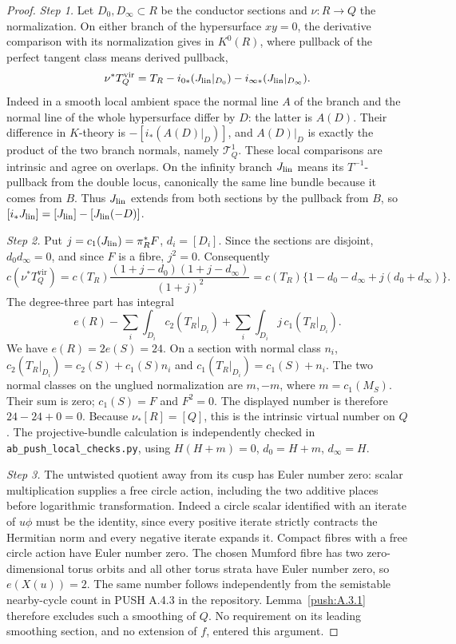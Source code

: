 \documentclass[11pt,a4paper]{article}
\theoremstyle{plain}
\theoremstyle{definition}
\begin{document}
\begin{proof}
\par\noindent\textit{Step 1.} Let $D_0,D_\infty\subset R$ be the conductor sections and
$\nu:R\to Q$ the normalization. On either branch of the
hypersurface $xy=0$, the derivative comparison with its
normalization gives in $K^0(R)$, where pullback of the
perfect tangent class means derived pullback,
\[
 \nu^*T_Q^{\mathrm{vir}}
 =T_R-i_{0*}(J_{\rm lin}|_{D_0})-i_{\infty*}(J_{\rm lin}|_{D_\infty}).
\]
Indeed in a smooth local ambient space the normal line $A$ of
the branch and the normal line of the whole hypersurface
differ by $D$: the latter is $A(D)$. Their difference in
$K$-theory is $-[i_*(A(D)|_D)]$, and $A(D)|_D$ is exactly
the product of the two branch normals, namely $\mathcal T^1_Q$.
These local comparisons are intrinsic and agree on overlaps.
On the infinity branch $J_{\rm lin}$ means its $T^{-1}$-pullback
from the double locus, canonically the same line bundle
because it comes from $B$. Thus $J_{\rm lin}$ extends from both sections by the pullback from $B$,
so $[i_*J_{\rm lin}]=[J_{\rm lin}]-[J_{\rm lin}(-D)]$.

\par\noindent\textit{Step 2.} Put $j=c_1(J_{\rm lin})=\pi_R^*F$, $d_i=[D_i]$. Since the sections are
disjoint, $d_0d_\infty=0$, and since $F$ is a fibre, $j^2=0$.
Consequently
\[
 c(\nu^*T_Q^{\mathrm{vir}})
 =c(T_R)\frac{(1+j-d_0)(1+j-d_\infty)}{(1+j)^2}
 =c(T_R)\{1-d_0-d_\infty+j(d_0+d_\infty)\}.
\]
The degree-three part has integral
\[
 e(R)-\sum_i\int_{D_i}c_2(T_R|_{D_i})
       +\sum_i\int_{D_i}j\,c_1(T_R|_{D_i}).
\]
We have $e(R)=2e(S)=24$. On a section with normal class
$n_i$, $c_2(T_R|_{D_i})=c_2(S)+c_1(S)n_i$ and
$c_1(T_R|_{D_i})=c_1(S)+n_i$. The two normal classes on
the unglued normalization are $m,-m$, where $m=c_1(M_S)$.
Their sum is zero; $c_1(S)=F$ and $F^2=0$. The displayed
number is therefore $24-24+0=0$. Because
$\nu_*[R]=[Q]$, this is the intrinsic virtual number on $Q$.
The projective-bundle calculation is independently checked
in \texttt{ab\_push\_local\_checks.py}, using
$H(H+m)=0$, $d_0=H+m$, $d_\infty=H$.

\par\noindent\textit{Step 3.} The untwisted quotient away from its cusp has Euler number zero:
scalar multiplication supplies a free circle action, including
the two additive places before logarithmic transformation. Indeed
a circle scalar identified with an iterate of $u\phi$ must be
the identity, since every positive iterate strictly contracts
the Hermitian norm and every negative iterate expands it.
Compact fibres with a free circle action have Euler number zero.
The chosen Mumford fibre has two zero-dimensional torus orbits
and all other torus strata have Euler number zero, so
$e(X(u))=2$. The same number follows independently from the
semistable nearby-cycle count in PUSH A.4.3 in the repository. Lemma~\ref{push:A.3.1}
therefore excludes such a smoothing of $Q$. No requirement
on its leading smoothing section, and no extension of $f$,
entered this argument.


\end{proof}
\end{document}
